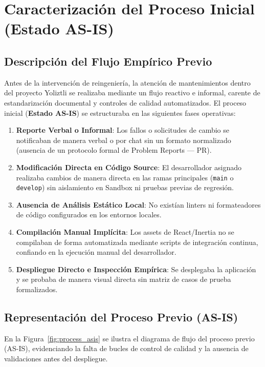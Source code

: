 \documentclass[12pt]{article}
\begin{document}
\section{Caracterización del Proceso Inicial (Estado AS-IS)}

\subsection{Descripción del Flujo Empírico Previo}
Antes de la intervención de reingeniería, la atención de mantenimientos dentro del proyecto Yoliztli se realizaba mediante un flujo reactivo e informal, carente de estandarización documental y controles de calidad automatizados. El proceso inicial (\textbf{Estado AS-IS}) se estructuraba en las siguientes fases operativas:

\begin{enumerate}
    \item \textbf{Reporte Verbal o Informal}: Los fallos o solicitudes de cambio se notificaban de manera verbal o por chat sin un formato normalizado (ausencia de un protocolo formal de Problem Reports --- PR).
    \item \textbf{Modificación Directa en Código Source}: El desarrollador asignado realizaba cambios de manera directa en las ramas principales (\texttt{main} o \texttt{develop}) sin aislamiento en Sandbox ni pruebas previas de regresión.
    \item \textbf{Ausencia de Análisis Estático Local}: No existían linters ni formateadores de código configurados en los entornos locales.
    \item \textbf{Compilación Manual Implícita}: Los assets de React/Inertia no se compilaban de forma automatizada mediante scripts de integración continua, confiando en la ejecución manual del desarrollador.
    \item \textbf{Despliegue Directo e Inspección Empírica}: Se desplegaba la aplicación y se probaba de manera visual directa sin matriz de casos de prueba formalizados.
\end{enumerate}

\subsection{Representación del Proceso Previo (AS-IS)}
En la Figura~\ref{fig:process_asis} se ilustra el diagrama de flujo del proceso previo (AS-IS), evidenciando la falta de bucles de control de calidad y la ausencia de validaciones antes del despliegue.
\end{document}
